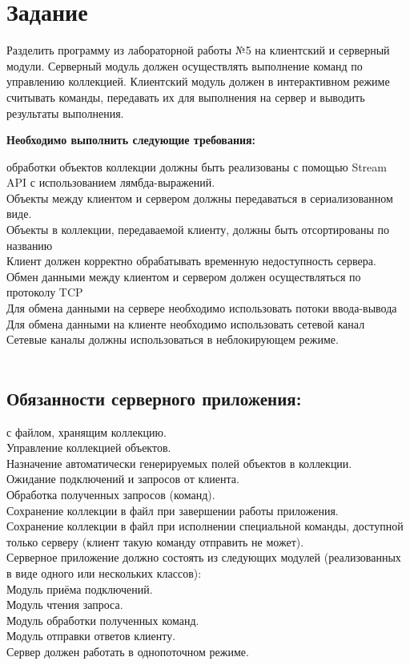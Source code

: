 

\section{Задание}
Разделить программу из лабораторной работы №5 на клиентский и серверный модули. Серверный модуль должен осуществлять выполнение команд по управлению коллекцией. Клиентский модуль должен в интерактивном режиме считывать команды, передавать их для выполнения на сервер и выводить результаты выполнения.

\textbf{Необходимо выполнить следующие требования:}

 обработки объектов коллекции должны быть реализованы с помощью Stream API с использованием лямбда-выражений.\\
Объекты между клиентом и сервером должны передаваться в сериализованном виде.\\
Объекты в коллекции, передаваемой клиенту, должны быть отсортированы по названию\\
Клиент должен корректно обрабатывать временную недоступность сервера.\\
Обмен данными между клиентом и сервером должен осуществляться по протоколу TCP\\
Для обмена данными на сервере необходимо использовать потоки ввода-вывода\\
Для обмена данными на клиенте необходимо использовать сетевой канал\\
Сетевые каналы должны использоваться в неблокирующем режиме.\\
\\
\subsection{Обязанности серверного приложения:}

 с файлом, хранящим коллекцию.\\
Управление коллекцией объектов.\\
Назначение автоматически генерируемых полей объектов в коллекции.\\
Ожидание подключений и запросов от клиента.\\
Обработка полученных запросов (команд).\\
Сохранение коллекции в файл при завершении работы приложения.\\
Сохранение коллекции в файл при исполнении специальной команды, доступной только серверу (клиент такую команду отправить не может).\\
Серверное приложение должно состоять из следующих модулей (реализованных в виде одного или нескольких классов):\\
Модуль приёма подключений.\\
Модуль чтения запроса.\\
Модуль обработки полученных команд.\\
Модуль отправки ответов клиенту.\\
Сервер должен работать в однопоточном режиме.\\
